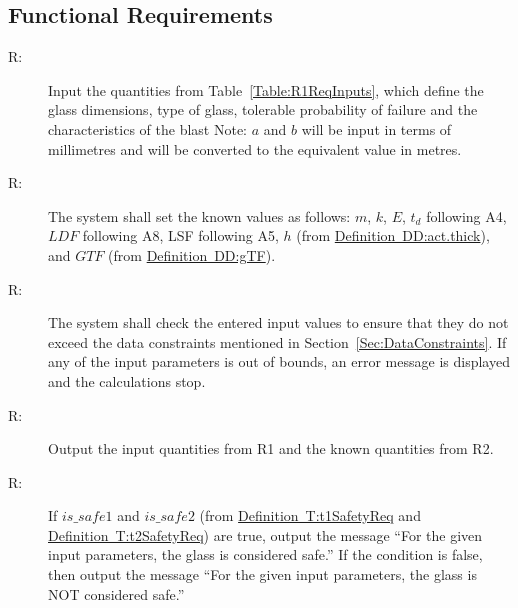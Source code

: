 \documentclass[12pt]{article}
\newcounter{reqnum}
\newcommand{\rthereqnum}{R\thereqnum}
\begin{document}
\subsection{Functional Requirements}
\label{Sec:FRs}
\begin{description}
\item[\rthereqnum\label{FR:s7.1.req1}:]Input the quantities from Table~\ref{Table:R1ReqInputs}, which define the glass dimensions, type of glass, tolerable probability of failure and the characteristics of the blast Note: $a$ and $b$ will be input in terms of millimetres and will be converted to the equivalent value in metres.
\end{description}
\begin{description}
\item[\rthereqnum\label{FR:s7.1.req2}:]The system shall set the known values as follows: $m$, $k$, $E$, ${t_{d}}$ following A4, $LDF$ following A8, LSF following A5, $h$ (from \hyperref[DD:act.thick]{Definition~DD:act.thick}), and $GTF$ (from \hyperref[DD:gTF]{Definition~DD:gTF}).
\end{description}
\begin{description}
\item[\rthereqnum\label{FR:s7.1.req3}:]The system shall check the entered input values to ensure that they do not exceed the data constraints mentioned in Section~\ref{Sec:DataConstraints}. If any of the input parameters is out of bounds, an error message is displayed and the calculations stop.
\end{description}
\begin{description}
\item[\rthereqnum\label{FR:s7.1.req4}:]Output the input quantities from R1 and the known quantities from R2.
\end{description}
\begin{description}
\item[\rthereqnum\label{FR:s7.1.req5}:]If $is\_safe1$ and $is\_safe2$ (from \hyperref[T:t1SafetyReq]{Definition~T:t1SafetyReq} and \hyperref[T:t2SafetyReq]{Definition~T:t2SafetyReq}) are true, output the message ``For the given input parameters, the glass is considered safe.'' If the condition is false, then output the message ``For the given input parameters, the glass is NOT considered safe.''
\end{description}
\end{document}
